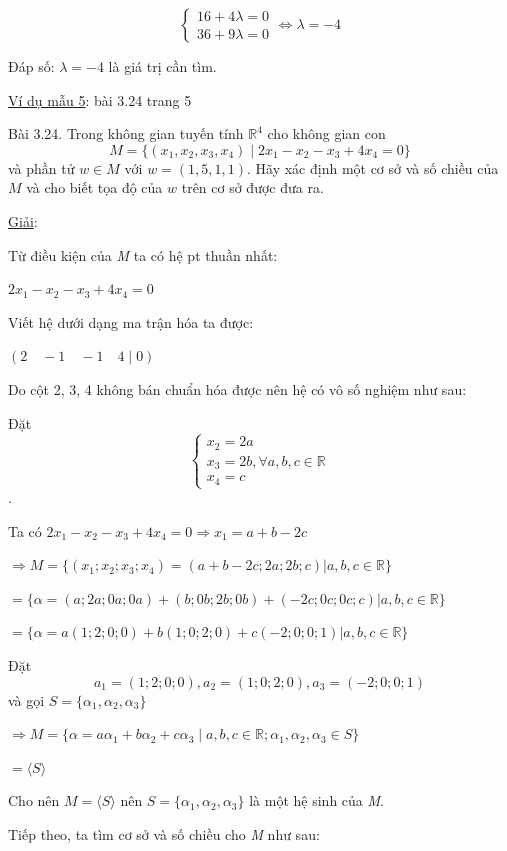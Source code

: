 \documentclass[12pt,a4paper]{article}
\newcommand{\ul}[1]{\uline{#1}}
\begin{document}
\[\begin{cases} 16 + 4\lambda = 0 \\ 36 + 9\lambda = 0 \end{cases} \Leftrightarrow \lambda = -4\]

Đáp số: $\lambda = -4$ là giá trị
cần tìm.

\ul{Ví dụ mẫu 5}: bài 3.24 trang 5

Bài 3.24. Trong không gian tuyến tính $\mathbb{R}^4$ cho không
gian con
\[ M = \{(x_1, x_2, x_3, x_4) \mid 2x_1 - x_2 - x_3 + 4x_4 = 0\} \]
và phần tử $w \in M$ với $w = (1, 5, 1, 1)$. Hãy xác định
một cơ sở và số chiều của $M$ và cho biết tọa độ của
$w$ trên cơ sở được đưa ra.

\ul{Giải}:

Từ điều kiện của \emph{M} ta có hệ pt thuần nhất:

$2x_1 - x_2 - x_3 + 4x_4 = 0$

Viết hệ dưới dạng ma trận hóa ta được:

$(2 \quad -1 \quad -1 \quad 4 \mid 0)$

Do cột 2, 3, 4 không bán chuẩn hóa được nên hệ có vô số nghiệm như sau:

Đặt \[\begin{cases} x_2 = 2a \\ x_3 = 2b, \forall a,b,c \in \mathbb{R} \\ x_4 = c \end{cases}\].

Ta có $2x_1 - x_2 - x_3 + 4x_4 = 0 \Rightarrow x_1 = a + b - 2c$

$\Rightarrow M = \{(x_1; x_2; x_3; x_4) = (a + b - 2c; 2a; 2b; c) | a,b,c \in \mathbb{R}\}$

$= \{ \alpha = (a; 2a; 0a; 0a) + (b; 0b; 2b; 0b) + (-2c; 0c; 0c; c) | a,b,c \in \mathbb{R} \}$

$= \{ \alpha = a(1; 2; 0; 0) + b(1; 0; 2; 0) + c(-2; 0; 0; 1) | a,b,c \in \mathbb{R} \}$

Đặt
\[ a_1 = (1; 2; 0; 0), a_2 = (1; 0; 2; 0), a_3 = (-2; 0; 0; 1) \]
và gọi $S = \{ \alpha_1, \alpha_2, \alpha_3 \}$

$\Rightarrow M = \{ \alpha = a\alpha_1 + b\alpha_2 + c\alpha_3 \mid a, b, c \in \mathbb{R}; \alpha_1, \alpha_2, \alpha_3 \in S \}$

$= \langle S \rangle$

Cho nên $M = \langle S \rangle$ nên
$S = \{ \alpha_1, \alpha_2, \alpha_3 \}$ là một hệ sinh của
\emph{M}.

Tiếp theo, ta tìm cơ sở và số chiều cho \emph{M} như sau:
\end{document}
